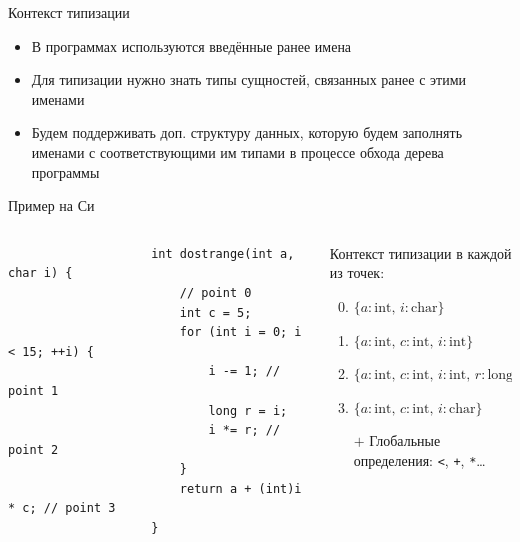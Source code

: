     \begin{frame}[fragile]{Контекст типизации}
        \begin{itemize}
            \item В программах используются введённые ранее имена
            \item Для типизации нужно знать типы сущностей, связанных ранее с этими именами
            \item Будем поддерживать доп. структуру данных, которую будем заполнять именами с соответствующими им типами в процессе обхода дерева программы
        \end{itemize}
        \begin{block}{Пример на Си}
            \vspace{-1em}
            \begin{columns}[onlytextwidth]
                \begin{column}{0.485\textwidth}
                    \begin{verbatim}
                    int dostrange(int a, char i) {
                        // point 0
                        int c = 5;
                        for (int i = 0; i < 15; ++i) {
                            i -= 1; // point 1
                            long r = i;
                            i *= r; // point 2
                        }
                        return a + (int)i * c; // point 3
                    }
                    \end{verbatim}
                \end{column}\hfill%
                \begin{column}{0.485\textwidth}
                    Контекст типизации в каждой из точек:
                    \begin{enumerate}
                        \setcounter{enumi}{-1}
                        \item $\{a : \mathrm{int},\, i : \mathrm{char}\}$
                        \item \pause $\{a : \mathrm{int},\, c : \mathrm{int},\, i : \mathrm{int}\}$
                        \item \pause $\{a : \mathrm{int},\, c : \mathrm{int},\, i : \mathrm{int},\, r : \mathrm{long}\}$
                        \item \pause $\{a : \mathrm{int},\, c : \mathrm{int},\, i : \mathrm{char}\}$
                        \item[$+$] \pause Глобальные определения: \pause \texttt{<}, \texttt{+}, \texttt{*}\ldots
                    \end{enumerate}
                \end{column}
            \end{columns}
        \end{block}
    \end{frame}

